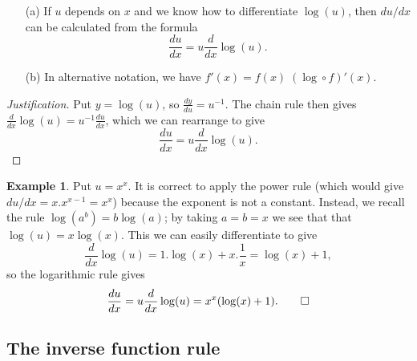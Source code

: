 \documentclass[a4paper]{book}
\theoremstyle{definition}
\newtheorem{example}[theorem]{Example}
\begin{document}
\begin{itemize}
 \item[(a)] If $u$ depends on $x$ and we know how to differentiate
  $\log(u)$, then $du/dx$ can be calculated from the formula
   \[ \frac{du}{dx} = u \frac{d}{dx}\log(u). \]
 \item[(b)] In alternative notation, we have
  $f'(x)=f(x)\;(\log\circ f)'(x)$. 
\end{itemize}
\begin{proof}[Justification]
 Put $y=\log(u)$, so $\frac{dy}{du}=u^{-1}$.  The chain rule then
 gives $\frac{d}{dx}\log(u)=u^{-1}\frac{du}{dx}$, which we can
 rearrange to give
 \[ \frac{du}{dx} = u \frac{d}{dx}\log(u). \]
\end{proof}
\begin{example}
 Put $u=x^x$.  It is  correct to apply the power rule (which
 would give $du/dx=x.x^{x-1}=x^x$) because the exponent is not a
 constant.  Instead, we recall the rule $\log(a^b)=b\log(a)$; by
 taking $a=b=x$ we see that that $\log(u)=x\log(x)$.  This we can
 easily differentiate to give 
 \[ \frac{d}{dx}\log(u) = 1.\log(x)+x.\frac{1}{x} = \log(x)+1, \]
 so the logarithmic rule gives
 \[ \frac{du}{dx} = u\frac{d}{dx}\log(u) = x^x(\log(x)+1). \qed \]
\end{example}

\subsection{The inverse function rule}
\label{subsec-rule-inv}
\end{document}
